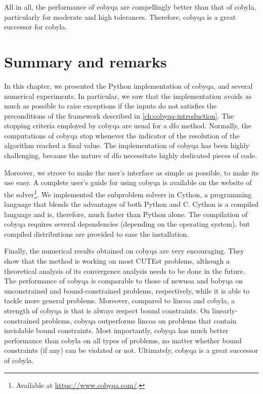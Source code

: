 All in all, the performance of \gls{cobyqa} are compellingly better than that of \gls{cobyla}, particularly for moderate and high tolerances.
Therefore, \gls{cobyqa} is a great successor for \gls{cobyla}.

\section{Summary and remarks}

In this chapter, we presented the Python implementation of \gls{cobyqa}, and several numerical experiments.
In particular, we saw that the implementation avoids as much as possible to raise exceptions if the inputs do not satisfies the preconditions of the framework described in \cref{ch:cobyqa-introduction}.
The stopping criteria employed by \gls{cobyqa} are usual for a \gls{dfo} method.
Normally, the computations of \gls{cobyqa} stop whenever the indicator of the resolution of the algorithm reached a final value.
The implementation of \gls{cobyqa} has been highly challenging, because the nature of \gls{dfo} necessitate highly dedicated pieces of code.

Moreover, we strove to make the user's interface as simple as possible, to make its use easy.
A complete user's guide for using \gls{cobyqa} is available on the website of the solver\footnote{Available at \url{https://www.cobyqa.com/}.}.
We implemented the subproblem solvers in Cython, a programming language that blends the advantages of both Python and C.
Cython is a compiled language and is, therefore, much faster than Python alone.
The compilation of \gls{cobyqa} requires several dependencies (depending on the operating system), but compiled distributions are provided to ease the installation.

Finally, the numerical results obtained on \gls{cobyqa} are very encouraging.
They show that the method is working on most CUTEst problems, although a theoretical analysis of its convergence analysis needs to be done in the future.
The performance of \gls{cobyqa} is comparable to those of \gls{newuoa} and \gls{bobyqa} on unconstrained and bound-constrained problems, respectively, while it is able to tackle more general problems.
Moreover, compared to \gls{lincoa} and \gls{cobyla}, a strength of \gls{cobyqa} is that is always respect bound constraints.
On linearly-constrained problems, \gls{cobyqa} outperforms \gls{lincoa} on problems that contain inviolable bound constraints.
Most importantly, \gls{cobyqa} has much better performance than \gls{cobyla} on all types of problems, no matter whether bound constraints (if any) can be violated or not.
Ultimately, \gls{cobyqa} is a great successor of \gls{cobyla}.
